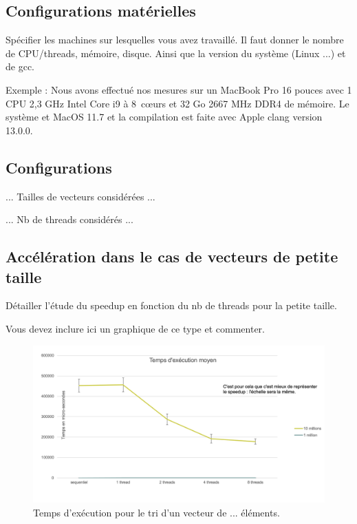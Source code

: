 \documentclass[11pt]{article}
\begin{document}
\subsection{Configurations matérielles}

Spécifier les machines sur lesquelles vous avez travaillé. Il faut donner le nombre de CPU/threads, mémoire, disque. Ainsi que la version du système (Linux ...) et de gcc.

Exemple : Nous avons effectué nos mesures sur un MacBook Pro 16 pouces avec 1 CPU 2,3 GHz Intel Core i9 à 8 cœurs et 32 Go 2667 MHz DDR4 de mémoire. Le système et MacOS 11.7 et la compilation est faite avec Apple clang version 13.0.0.

\subsection{Configurations}

... Tailles de vecteurs considérées ...

... Nb de threads considérés ...


\subsection{Accélération dans le cas de vecteurs de petite taille}

Détailler l'étude du speedup en fonction du nb de threads pour la petite taille.

Vous devez inclure ici un graphique de ce type et commenter.

\begin{figure}[ht]
\label{fig:t1}
\centering
\includegraphics[scale=0.3]{figures/fig}
\caption{Temps d'exécution pour le tri d'un vecteur de ... éléments.}
\label{fig:index:uml}
\end{figure}
\end{document}

